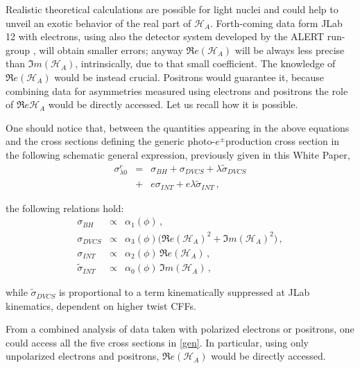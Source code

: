 \documentclass[times, twoside]{PosWhiPap}
\begin{document}
Realistic theoretical calculations are possible
for light nuclei and could help to unveil an exotic 
behavior of the real part of $\mathcal{H}_{A}$.
Forth-coming data form
JLab 12 with electrons, using also the detector system
developed by the ALERT run-group \cite{Armstrong:2017wfw}, 
will obtain smaller errors;
anyway $\Re e(\mathcal{H}_{A})$ will be always less precise than
$\Im m(\mathcal{H}_{A})$, intrinsically, due to that small coefficient.
The knowledge of $\Re e(\mathcal{H}_{A})$ would be instead crucial.
Positrons would guarantee it, because combining data
for asymmetries measured using electrons and positrons
the role of $\Re e \mathcal{H}_{A}$ would be directly accessed.
Let us recall how it is possible.

One should notice that, between the quantities appearing in the above
equations and the
cross sections defining the generic photo-$e^\pm$production cross section
in the following schematic general expression, previously given in this White Paper,
\begin{eqnarray}
\sigma^e_{\lambda 0}  & = & \sigma_{BH} + \sigma_{DVCS} + \lambda \tilde \sigma_{DVCS} 
\nonumber
\\
& + & e\sigma_{INT} + e \lambda \tilde \sigma_{INT} \, ,
\label{gen}
\end{eqnarray}

the following relations hold:
\begin{eqnarray}
\sigma_{BH} & \propto & \alpha_1(\phi)\, ,
\nonumber \\
\sigma_{DVCS} & \propto &   \alpha_{3}(\phi) 
\big( \Re e(\mathcal{H}_{A})^{2} + \Im m(\mathcal{H}_{A})^{2} \big) \, ,
\nonumber \\
\sigma_{INT} & \propto & \alpha_{2}(\phi) \, \Re e(\mathcal{H}_{A}) \, ,
\nonumber \\
\tilde \sigma_{INT} & \propto & \alpha_{0}(\phi) \, \Im m(\mathcal{H}_{A}) \, ,
\end{eqnarray}

while $\tilde \sigma_{DVCS} $ is proportional to a term kinematically suppressed
at JLab kinematics, dependent on higher twist CFFs. 

From a combined analysis of data taken with polarized electrons or positrons,
one could access all the five cross sections in  \eqref{gen}.
In particular, using only unpolarized electrons and positrons, 
$\Re e(\mathcal{H}_{A})$ would be directly accessed.
\end{document}
